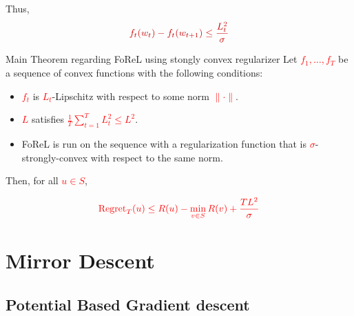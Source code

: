 \documentclass{beamer}
\newcommand{\mathred}[1]{\textcolor{mathred}{#1}}
\begin{document}
\begin{small}
\begin{frame}
Thus,
\begin{equation*}
\mathred{f_t(w_t) - f_t(w_{t+1}) \leq \frac{L_t^2}{\sigma}}
\end{equation*}
\end{frame}
\fi

\begin{frame}{Main Theorem regarding FoReL using stongly convex regularizer}
Let \textcolor{red}{$f_1, \ldots, f_T$} be a sequence of convex functions with the following conditions:

\begin{itemize}
  \item \textcolor{red}{$f_t$} is \textcolor{red}{$L_t$}-Lipschitz with respect to some norm \textcolor{red}{$\|\cdot\|$}.
  \item \textcolor{red}{$L$} satisfies \textcolor{red}{$\frac{1}{T} \sum_{t=1}^{T} L_t^2 \leq L^2$}.
  \item FoReL is run on the sequence with a regularization function that is \textcolor{red}{$\sigma$}-strongly-convex with respect to the same norm.
\end{itemize}

Then, for all \textcolor{red}{$u \in S$},

\begin{equation*}
\textcolor{red}{\text{Regret}_T(u) \leq R(u) - \min_{v \in S} R(v) + \frac{TL^2}{\sigma}}
\end{equation*}

\end{frame}



\section{Mirror Descent}

\subsection{Potential Based Gradient descent}


\end{small}
\end{document}
